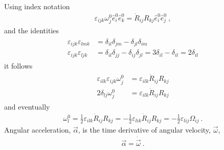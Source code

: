 \documentclass[letterpaper,10pt,english]{jupyterBook}
\begin{document}
\sphinxAtStartPar
Using index notation
\begin{equation*}
\begin{split}\varepsilon_{ijk} \omega^0_j \hat{e}^0_i \hat{e}^0_k = \dot{R}_{ij} R_{kj} \hat{e}^0_i \hat{e}^0_j \ ,\end{split}
\end{equation*}
\sphinxAtStartPar
and the identities
\begin{equation*}
\begin{split}\begin{aligned}
  \varepsilon_{ijk} \varepsilon_{lmk} & = \delta_{il} \delta_{jm} - \delta_{jl} \delta_{im} \\
  \varepsilon_{ijk} \varepsilon_{ljk} & = \delta_{il} \delta_{jj} - \delta_{ij} \delta_{jl} = 3 \delta_{il} - \delta_{il} = 2 \delta_{il}
\end{aligned}\end{split}
\end{equation*}
\sphinxAtStartPar
it follows
\begin{equation*}
\begin{split}\begin{aligned}
  \varepsilon_{ilk} \varepsilon_{ijk} \omega^0_j & = \varepsilon_{ilk} \dot{R}_{ij} R_{kj} \\
  2 \delta_{lj} \omega^0_j & = \varepsilon_{ilk} \dot{R}_{ij} R_{kj}
\end{aligned}\end{split}
\end{equation*}
\sphinxAtStartPar
and eventually
\begin{equation*}
\begin{split}\omega^0_l = \frac{1}{2} \varepsilon_{ilk} \dot{R}_{ij} R_{kj} = - \frac{1}{2} \varepsilon_{lik} \dot{R}_{ij} R_{kj} = -\frac{1}{2} \varepsilon_{lij} \Omega_{ij} \ .\end{split}
\end{equation*}
\sphinxAtStartPar
{} Angular acceleration, \(\vec{\alpha}\), is the time derivative of angular velocity, \(\vec{\omega}\),
\begin{equation*}
\begin{split}\vec{\alpha} = \dot{\vec{\omega}} \ .\end{split}
\end{equation*}
\end{document}
